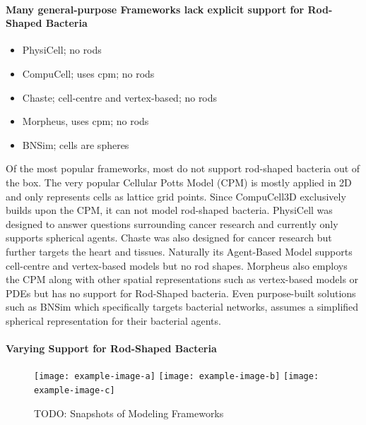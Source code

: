 \documentclass{article}
\begin{document}
\paragraph{Many general-purpose Frameworks lack explicit support for Rod-Shaped Bacteria}

\begin{itemize}
    \item \cite{Ghaffarizadeh2018} PhysiCell; no rods
    \item \cite{Swat2012} CompuCell; uses \ac{cpm}; no rods
    \item \cite{Cooper2020} Chaste; cell-centre and vertex-based; no rods
    \item \cite{Starru2014} Morpheus, uses \ac{cpm}; no rods
    \item \cite{Wei2013} BNSim; cells are spheres
\end{itemize}

Of the most popular frameworks, most do not support rod-shaped bacteria out of the box.
The very popular Cellular Potts Model (CPM) \cite{Graner1992} is mostly applied in 2D and only
represents cells as lattice grid points.
Since CompuCell3D \cite{Swat2012} exclusively builds upon the CPM, it can not model rod-shaped
bacteria.
PhysiCell \cite{Ghaffarizadeh2018} was designed to answer questions surrounding cancer research and
currently only supports spherical agents.
Chaste \cite{Cooper2020} was also designed for cancer research but further targets the heart and
tissues.
Naturally its Agent-Based Model supports cell-centre and vertex-based models but no rod shapes.
Morpheus \cite{Starru2014} also employs the CPM along with other spatial representations such as
vertex-based models or PDEs but has no support for Rod-Shaped bacteria.
Even purpose-built solutions such as BNSim \cite{Wei2013} which specifically targets bacterial
networks, assumes a simplified spherical representation for their bacterial agents.

\paragraph{Varying Support for Rod-Shaped Bacteria}

\begin{figure}[H]
    \centering
    \texttt{[image: example-image-a]}
    \texttt{[image: example-image-b]}
    \texttt{[image: example-image-c]}
    \caption{TODO: Snapshots of Modeling Frameworks}
\end{figure}
\end{document}
